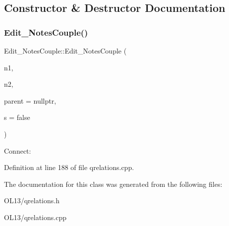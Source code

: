\subsection{Constructor \& Destructor Documentation}
\mbox{\label{class_edit___notes_couple_aa0780f3a53175747c5a7136d4f2ffa30}} 
\subsubsection{\texorpdfstring{Edit\+\_\+\+Notes\+Couple()}{Edit\_NotesCouple()}}
{\footnotesize\ttfamily Edit\+\_\+\+Notes\+Couple\+::\+Edit\+\_\+\+Notes\+Couple (\begin{DoxyParamCaption}\item[{\hyperlink{class_note}{Note} $\ast$}]{n1,  }\item[{\hyperlink{class_note}{Note} $\ast$}]{n2,  }\item[{Q\+Widget $\ast$}]{parent = {\ttfamily nullptr},  }\item[{bool}]{s = {\ttfamily false} }\end{DoxyParamCaption})}

Connect\+: 

Definition at line 188 of file qrelations.\+cpp.



The documentation for this class was generated from the following files\+:\begin{DoxyCompactItemize}
\item 
O\+L13/qrelations.\+h\item 
O\+L13/qrelations.\+cpp\end{DoxyCompactItemize}
